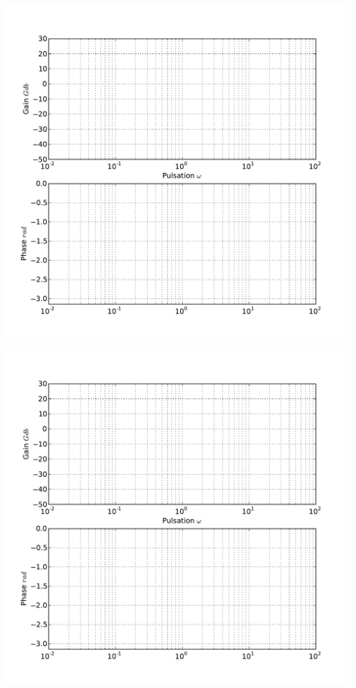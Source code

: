 \documentclass[10pt]{article}
\begin{document}
\begin{center}
\includegraphics[width=.9\textwidth]{images/bode_vierge.pdf}
\end{center}



\begin{center}
\includegraphics[width=.9\textwidth]{images/bode_vierge.pdf}
\end{center}
\end{document}
